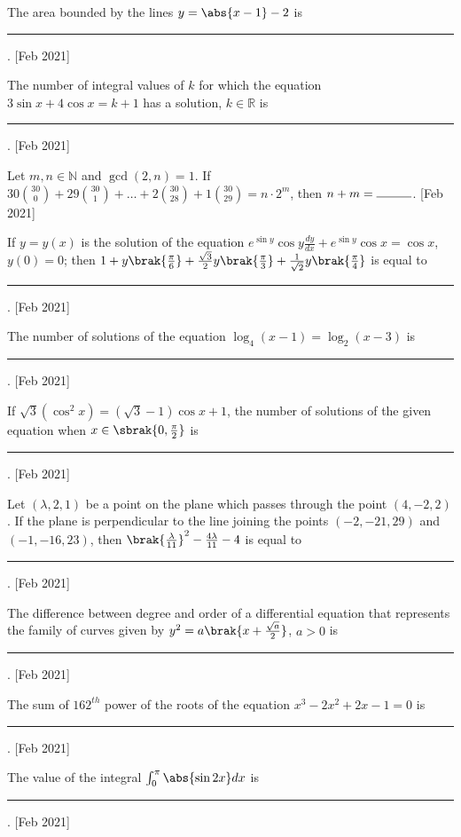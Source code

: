 \iffalse
\title{2021}
\author{AI24BTECH11031}
\section{integer}
\fi

\item The area bounded by the lines $y = \abs{x - 1} - 2$ is \rule{1cm}{0.15mm}.
\hfill{[Feb 2021]}

\item The number of integral values of $k$ for which the equation
$3\sin x + 4\cos x = k + 1$ has a solution, $k \in \mathbb{R}$ is \rule{1cm}{0.15mm}.
\hfill{[Feb 2021]}

\item Let $m, n \in \mathbb{N}$ and $\gcd(2, n) = 1$. If
$30\binom{30}{0} + 29\binom{30}{1} + \dots + 2\binom{30}{28} + 1\binom{30}{29} = n \cdot 2^m$,
then $n + m = \rule{1cm}{0.15mm}$.
\hfill{[Feb 2021]}

\item If $y = y(x)$ is the solution of the equation $e^{\sin y}\cos y \frac{dy}{dx} + e^{\sin y}\cos x = \cos x$,
$y(0) = 0$; then $1 + y\brak{\frac{\pi}{6}} + \frac{\sqrt{3}}{2} y\brak{\frac{\pi}{3}} + \frac{1}{\sqrt{2}} y\brak{\frac{\pi}{4}}$
is equal to \rule{1cm}{0.15mm}.
\hfill{[Feb 2021]}

\item The number of solutions of the equation $\log_4(x - 1) = \log_2(x - 3)$ is \rule{1cm}{0.15mm}.
\hfill{[Feb 2021]}

\item If $\sqrt{3}(\cos^2 x) = (\sqrt{3} - 1) \cos x + 1$, the number of solutions
of the given equation when $x \in \sbrak{0, \frac{\pi}{2}}$ is \rule{1cm}{0.15mm}.
\hfill{[Feb 2021]}

\item Let $(\lambda, 2, 1)$ be a point on the plane which passes through the point
$(4, -2, 2)$. If the plane is perpendicular to the line joining the points
$(-2, -21, 29)$ and $(-1, -16, 23)$, then $\brak{\frac{\lambda}{11}}^2 - \frac{4\lambda}{11} - 4$
is equal to \rule{1cm}{0.15mm}.
\hfill{[Feb 2021]}

\item The difference between degree and order of a differential equation that
represents the family of curves given by $y^2 = a \brak{x + \frac{\sqrt{a}}{2}}$,
$a > 0$ is \rule{1cm}{0.15mm}.
\hfill{[Feb 2021]}

\item The sum of $162^{th}$ power of the roots of the equation
$x^3 - 2x^2 + 2x - 1 = 0$ is \\
\rule{1cm}{0.15mm}. \hfill{[Feb 2021]}

\item The value of the integral $\int_0^\pi \abs{\sin 2x} dx$ is \rule{1cm}{0.15mm}.
\hfill{[Feb 2021]}

